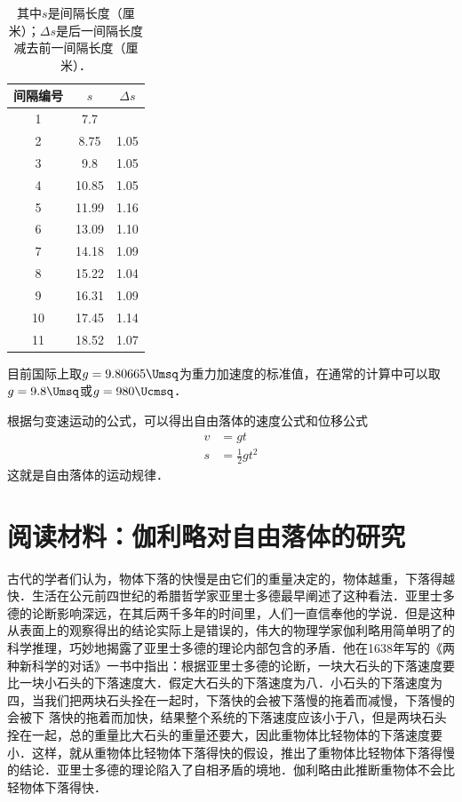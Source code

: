 \begin{table}
	\centering
	\caption{其中$s$是间隔长度（厘米）；$\Delta s$是后一间隔长度减去前一间隔长度（厘米）．}\label{tab-A-2.1}
\begin{tabular}{ccc}
\toprule
间隔编号&
$s$&$\Delta s$
 \\
 \midrule
	1&	7.7&	\\
	2&	8.75&	1.05
\\
	3&	9.8&	1.05
\\
	4&	10.85&	1.05
\\
	5&	11.99&	1.16
\\
	6&	13.09&	1.10
\\
	7&	14.18&	1.09
\\
	8&	15.22&	1.04
\\
	9&	16.31&	1.09
\\
	10&	17.45&	1.14
\\
	11&	18.52&	1.07\\
\bottomrule
\end{tabular}

\end{table}



目前国际上取$g=9.80665\Umsq$为重力加速度的标准值，在通常的计算中可以取$g=9.8\Umsq$或$g=980 \Ucmsq $．

根据匀变速运动的公式，可以得出自由落体的速度公式和位移公式
\[\begin{split}
v&=gt\\
s&=\frac{1}{2}gt^2
\end{split}\]
这就是自由落体的运动规律．


\section*{阅读材料：伽利略对自由落体的研究}
古代的学者们认为，物体下落的快慢是由它们的重量决定的，物体越重，下落得越快．生活在公元前四世纪的希腊哲学家亚里士多德最早阐述了这种看法．亚里士多德的论断影响深远，在其后两千多年的时间里，人们一直信奉他的学说．但是这种从表面上的观察得出的结论实际上是错误的，伟大的物理学家伽利略用简单明了的科学推理，巧妙地揭露了亚里士多德的理论内部包含的矛盾．他在1638年写的《两种新科学的对话》一书中指出：根据亚里士多德的论断，一块大石头的下落速度要比一块小石头的下落速度大．假定大石头的下落速度为八．小石头的下落速度为四，当我们把两块石头拴在一起时，下落快的会被下落慢的拖着而减慢，下落慢的会被下
落快的拖着而加快，结果整个系统的下落速度应该小于八，但是两块石头拴在一起，总的重量比大石头的重量还要大，因此重物体比轻物体的下落速度要小．这样，就从重物体比轻物体下落得快的假设，推出了重物体比轻物体下落得慢的结论．亚里士多德的理论陷入了自相矛盾的境地．伽利略由此推断重物体不会比轻物体下落得快．

